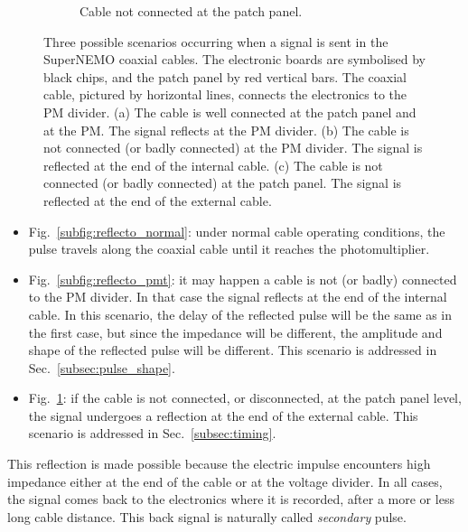 \begin{figure}[h!]
\begin{subfigure}[b]{0.3\textwidth}
    \captionsetup{justification=centering}
    \caption{Cable not connected at the patch panel.
      \label{subfig:reflecto_pp}}
  \end{subfigure}
  \caption{Three possible scenarios occurring when a signal is sent in the SuperNEMO coaxial cables.
    The electronic boards are symbolised by black chips, and the patch panel by red vertical bars.
    The coaxial cable, pictured by horizontal lines, connects the electronics to the PM divider.
    (a) The cable is well connected at the patch panel and at the PM. The signal reflects at the PM divider.
    (b) The cable is not connected (or badly connected) at the PM divider. The signal is reflected at the end of the internal cable.
    (c) The cable is not connected (or badly connected) at the patch panel. The signal is reflected at the end of the external cable.
    \label{fig:reflecto_scheme}}
\end{figure}
\begin{itemize}
\item Fig.~\ref{subfig:reflecto_normal}: under normal cable operating conditions, the pulse travels along the coaxial cable until it reaches the photomultiplier.
\item Fig.~\ref{subfig:reflecto_pmt}: it may happen a cable is not (or badly) connected to the PM divider.
  In that case the signal reflects at the end of the internal cable.
  In this scenario, the delay of the reflected pulse will be the same as in the first case, but since the impedance will be different, the amplitude and shape of the reflected pulse will be different.
  This scenario is addressed in Sec.~\ref{subsec:pulse_shape}.
\item Fig.~\ref{subfig:reflecto_pp}: if the cable is not connected, or disconnected, at the patch panel level, the signal undergoes a reflection at the end of the external cable.
  This scenario is addressed in Sec.~\ref{subsec:timing}.
\end{itemize}
This reflection is made possible because the electric impulse encounters high impedance either at the end of the cable or at the voltage divider.
In all cases, the signal comes back to the electronics where it is recorded, after a more or less long cable distance.
This back signal is naturally called \emph{secondary} pulse.

